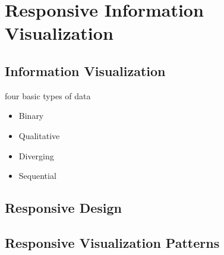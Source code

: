 \chapter{Responsive Information Visualization}

\label{chap:ResponsiveInfoVis}


\section{Information Visualization}

four basic types of data
\begin{itemize}
    \item Binary
    \item Qualitative
    \item Diverging
    \item Sequential
\end{itemize}

\section{Responsive Design}


\section{Responsive Visualization Patterns}


